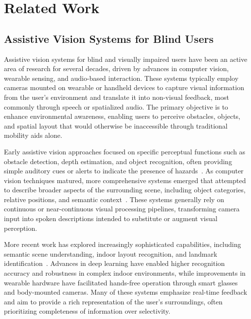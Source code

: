 \chapter{Related Work}
\label{ch:related_work}

\section{Assistive Vision Systems for Blind Users}
\label{sec:assistive_vision_systems}

Assistive vision systems for blind and visually impaired users have been an active
area of research for several decades, driven by advances in computer vision, wearable
sensing, and audio-based interaction. These systems typically employ cameras mounted
on wearable or handheld devices to capture visual information from the user's
environment and translate it into non-visual feedback, most commonly through speech
or spatialized audio. The primary objective is to enhance environmental awareness,
enabling users to perceive obstacles, objects, and spatial layout that would
otherwise be inaccessible through traditional mobility aids alone.

Early assistive vision approaches focused on specific perceptual functions such as
obstacle detection, depth estimation, and object recognition, often providing simple
auditory cues or alerts to indicate the presence of
hazards~\cite{dakopoulos2010wearable}. As computer vision techniques matured, more
comprehensive systems emerged that attempted to describe broader aspects of the
surrounding scene, including object categories, relative positions, and semantic
context~\cite{li2018vision}. These systems generally rely on continuous or
near-continuous visual processing pipelines, transforming camera input into spoken
descriptions intended to substitute or augment visual perception.

More recent work has explored increasingly sophisticated capabilities, including
semantic scene understanding, indoor layout recognition, and landmark
identification~\cite{fernandes2019review}. Advances in deep learning have enabled
higher recognition accuracy and robustness in complex indoor environments, while
improvements in wearable hardware have facilitated hands-free operation through smart
glasses and body-mounted cameras. Many of these systems emphasize real-time feedback
and aim to provide a rich representation of the user's surroundings, often
prioritizing completeness of information over selectivity.


